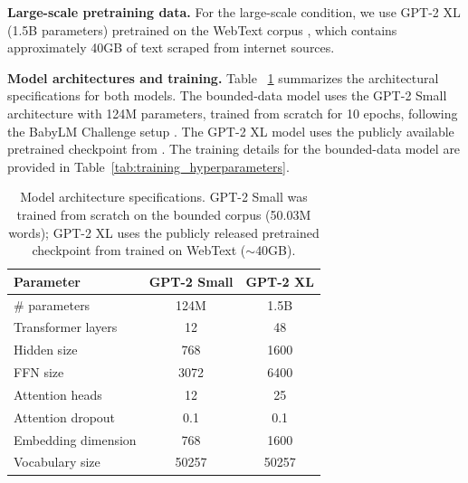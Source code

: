 \noindent \textbf{Large-scale pretraining data.} For the large-scale condition, we use GPT-2 XL (1.5B parameters) pretrained on the WebText corpus \citep{radford2019language}, which contains approximately 40GB of text scraped from internet sources.

\noindent \textbf{Model architectures and training.} Table ~\ref{tab:model_architecture} summarizes the architectural specifications for both models. The bounded-data model uses the GPT-2 Small architecture with 124M parameters, trained from scratch for 10 epochs, following the BabyLM Challenge setup \citep{hu2024findings}. The GPT-2 XL model uses the publicly available pretrained checkpoint from \citet{radford2019language}. The training details for the bounded-data model are provided in Table~\ref{tab:training_hyperparameters}.

\begin{table}[ht]
\centering
\small
\vspace{8pt}
\caption{Model architecture specifications. GPT-2 Small was trained from scratch on the bounded corpus (50.03M words); GPT-2 XL uses the publicly released pretrained checkpoint from \citet{radford2019language} trained on WebText ($\sim$40GB).}
\label{tab:model_architecture}
\setlength{\tabcolsep}{4pt}
\renewcommand{\arraystretch}{1.1}
\begin{tabular}{@{}lcc@{}}
\toprule
\textbf{Parameter} & \textbf{GPT-2 Small} & \textbf{GPT-2 XL} \\
\midrule
\# parameters       & 124M  & 1.5B  \\
Transformer layers  & 12    & 48    \\
Hidden size         & 768   & 1600  \\
FFN size            & 3072  & 6400  \\
Attention heads     & 12    & 25    \\
Attention dropout   & 0.1  & 0.1   \\
Embedding dimension & 768   & 1600  \\
Vocabulary size     & 50257 & 50257 \\
\bottomrule
\end{tabular}
\end{table}

